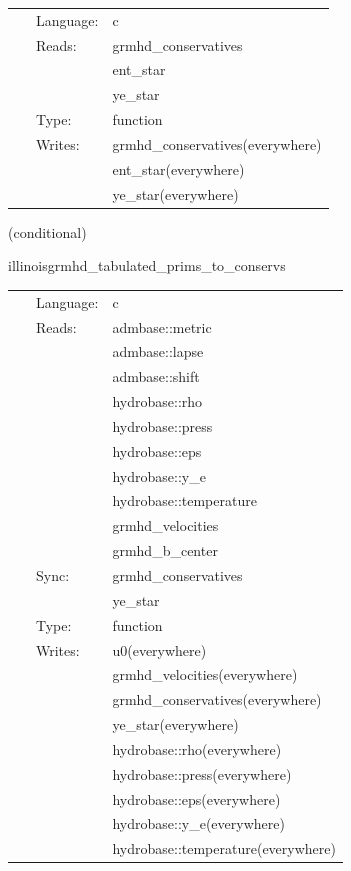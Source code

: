 \hspace{5mm}

 \begin{tabular*}{160mm}{cll} 
~ & Language:  & c \\ 
~ & Reads:  & grmhd\_conservatives \\ 
~& ~ &ent\_star\\ 
~& ~ &ye\_star\\ 
~ & Type:  & function \\ 
~ & Writes:  & grmhd\_conservatives(everywhere) \\ 
~& ~ &ent\_star(everywhere)\\ 
~& ~ &ye\_star(everywhere)\\ 
\end{tabular*} 


\vspace{5mm}

   (conditional) 

\hspace{5mm} illinoisgrmhd\_tabulated\_prims\_to\_conservs 

\hspace{5mm}{\it tabulated version of illinoisgrmhd\_prims\_to\_conservs } 


\hspace{5mm}

 \begin{tabular*}{160mm}{cll} 
~ & Language:  & c \\ 
~ & Reads:  & admbase::metric \\ 
~& ~ &admbase::lapse\\ 
~& ~ &admbase::shift\\ 
~& ~ &hydrobase::rho\\ 
~& ~ &hydrobase::press\\ 
~& ~ &hydrobase::eps\\ 
~& ~ &hydrobase::y\_e\\ 
~& ~ &hydrobase::temperature\\ 
~& ~ &grmhd\_velocities\\ 
~& ~ &grmhd\_b\_center\\ 
~ & Sync:  & grmhd\_conservatives \\ 
~& ~ &ye\_star\\ 
~ & Type:  & function \\ 
~ & Writes:  & u0(everywhere) \\ 
~& ~ &grmhd\_velocities(everywhere)\\ 
~& ~ &grmhd\_conservatives(everywhere)\\ 
~& ~ &ye\_star(everywhere)\\ 
~& ~ &hydrobase::rho(everywhere)\\ 
~& ~ &hydrobase::press(everywhere)\\ 
~& ~ &hydrobase::eps(everywhere)\\ 
~& ~ &hydrobase::y\_e(everywhere)\\ 
~& ~ &hydrobase::temperature(everywhere)\\ 
\end{tabular*} 


